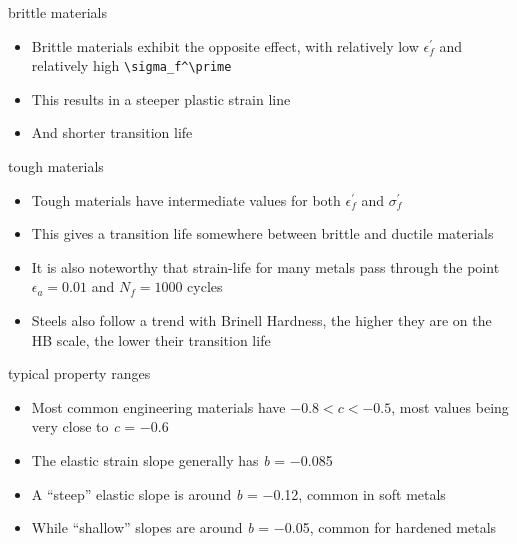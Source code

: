 \documentclass[
  letterpaper,
  ignorenonframetext,
  aspectratio=43,
  handout,
  12pt]{beamer}
\providecommand{\tightlist}{%
  \setlength{\itemsep}{0pt}\setlength{\parskip}{0pt}}
\providecommand{\tightlist}{%
\setlength{\itemsep}{0pt}\setlength{\parskip}{0pt}}
\begin{document}
\begin{frame}[fragile]{brittle materials}
\protect\hypertarget{brittle-materials}{}
\begin{itemize}
\tightlist
\item
  Brittle materials exhibit the opposite effect, with relatively low
  \(\epsilon_f^\prime\) and relatively high
  \texttt{\textbackslash{}sigma\_f\^{}\textbackslash{}prime}
\item
  This results in a steeper plastic strain line
\item
  And shorter transition life
\end{itemize}
\end{frame}

\begin{frame}{tough materials}
\protect\hypertarget{tough-materials}{}
\begin{itemize}
\tightlist
\item
  Tough materials have intermediate values for both
  \(\epsilon_f^\prime\) and \(\sigma_f^\prime\)
\item
  This gives a transition life somewhere between brittle and ductile
  materials
\item
  It is also noteworthy that strain-life for many metals pass through
  the point \(\epsilon_a = 0.01\) and \(N_f = 1000\) cycles
\item
  Steels also follow a trend with Brinell Hardness, the higher they are
  on the HB scale, the lower their transition life
\end{itemize}
\end{frame}

\begin{frame}{typical property ranges}
\protect\hypertarget{typical-property-ranges}{}
\begin{itemize}
\tightlist
\item
  Most common engineering materials have \(-0.8 < c < -0.5\), most
  values being very close to \emph{c} = −0.6
\item
  The elastic strain slope generally has \emph{b} = −0.085
\item
  A ``steep'' elastic slope is around \emph{b} = −0.12, common in soft
  metals
\item
  While ``shallow'' slopes are around \emph{b} = −0.05, common for
  hardened metals
\end{itemize}
\end{frame}
\end{document}
